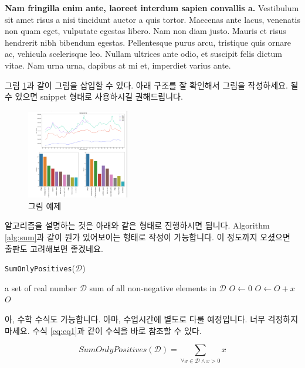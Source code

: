 \documentclass{pnu-survey}
\begin{document}
\textbf{Nam fringilla enim ante, laoreet interdum sapien convallis a.} Vestibulum sit amet risus a nisi tincidunt auctor a quis tortor. Maecenas ante lacus, venenatis non quam eget, vulputate egestas libero. Nam non diam justo. Mauris et risus hendrerit nibh bibendum egestas. Pellentesque purus arcu, tristique quis ornare ac, vehicula scelerisque leo. Nullam ultrices ante odio, et suscipit felis dictum vitae. Nam urna urna, dapibus at mi et, imperdiet varius ante.

그림 \ref{fig:example1}과 같이 그림을 삽입할 수 있다. 아래 구조를 잘 확인해서 그림을 작성하세요. 될 수 있으면 snippet 형태로 사용하시길 권해드립니다.

\begin{figure}[!ht]
\centering
\includegraphics[width=0.4\textwidth]{img/fig1.png}
\caption{그림 예제}
\label{fig:example1}
\end{figure}

알고리즘을 설명하는 것은 아래와 같은 형태로 진행하시면 됩니다. Algorithm \ref{alg:sum}과 같이 뭔가 있어보이는 형태로 작성이 가능합니다. 이 정도까지 오셨으면 출판도 고려해보면 좋겠네요.

\begin{algorithm}[!ht]
\label{alg:sum}
\caption[Short label]{\texttt{SumOnlyPositives}($\mathcal{D}$)}
\begin{algorithmic}[1]
\REQUIRE a set of real number $\mathcal{D}$ 
\ENSURE sum of all non-negative elements in $\mathcal{D}$ 
\STATE $O \leftarrow 0$
		\STATE $O \leftarrow O + x$
	\ENDIF
\ENDFOR
\RETURN $O$
\end{algorithmic}
\end{algorithm}

아, 수학 수식도 가능합니다. 아마, 수업시간에 별도로 다룰 예정입니다. 너무 걱정하지 마세요. 수식 
 \eqref{eq:eq1}과 같이 수식을 바로 참조할 수 있다.

\begin{equation}
\label{eq:eq1}
SumOnlyPositives(\mathcal{D}) = \sum_{\forall x \in \mathcal{D} \land x > 0 }x
\end{equation}
\end{document}

